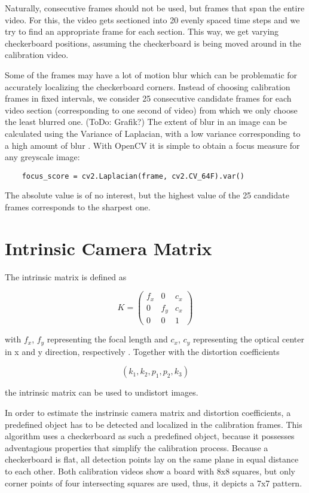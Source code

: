\documentclass[bibliography=totoc]{scrartcl}
\begin{document}
Naturally, consecutive frames should not be used, but frames that span the entire video.
For this, the video gets sectioned into 20 evenly spaced time steps and we try to find an appropriate frame for each section.
This way, we get varying checkerboard positions, assuming the checkerboard is being moved around in the calibration video.

Some of the frames may have a lot of motion blur which can be problematic for accurately localizing the checkerboard corners.
Instead of choosing calibration frames in fixed intervals, we consider 25 consecutive candidate frames for each video section (corresponding to one second of video) from which we only choose the least blurred one. (ToDo: Grafik?)
The extent of blur in an image can be calculated using the Variance of Laplacian, with a low variance corresponding to a high amount of blur \cite{BlurDetection}.
With OpenCV it is simple to obtain a focus measure for any greyscale image:

\begin{lstlisting}
    focus_score = cv2.Laplacian(frame, cv2.CV_64F).var()
\end{lstlisting}

The absolute value is of no interest, but the highest value of the 25 candidate frames corresponds to the sharpest one.


\section{Intrinsic Camera Matrix}
The intrinsic matrix is defined as

$$
K =
\begin{pmatrix}
    f_x & 0 & c_x \\
    0 & f_y & c_x \\
    0 & 0 & 1
\end{pmatrix}
$$

with $f_x$, $f_y$ representing the focal length and $c_x$, $c_y$ representing the optical center in x and y direction, respectively \cite{CameraCalibration}.
Together with the distortion coefficients 

$$(k_1, k_2, p_1, p_2, k_3)$$

the intrinsic matrix can be used to undistort images.

In order to estimate the instrinsic camera matrix and distortion coefficients, a predefined object has to be detected and localized in the calibration frames.
This algorithm uses a checkerboard as such a predefined object, because it possesses adventagious properties that simplify the calibration process.
Because a checkerboard is flat, all detection points lay on the same plane in equal distance to each other.
Both calibration videos show a board with 8x8 squares, but only corner points of four intersecting squares are used, thus, it depicts a 7x7 pattern.
\end{document}
